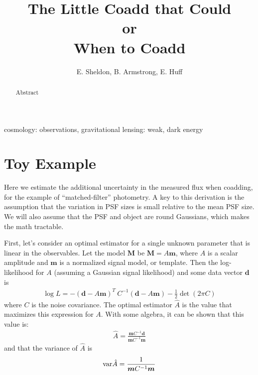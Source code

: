 \documentclass[a4paper,fleqn,usenatbib,referee]{mnras}
\title{The Little Coadd that Could\\
or\\
When to Coadd}
\author[E. Sheldon, B. Armstrong, E. Huff]{E. Sheldon, B. Armstrong, E. Huff}
\begin{document}
\maketitle

\begin{abstract}

    Abstract

\end{abstract}


\begin{keywords}                                                                    
    cosmology: observations,
    gravitational lensing: weak,
    dark energy
\end{keywords} 

\section{Toy Example} \label{sec:intro}

Here we estimate the additional uncertainty in the measured flux when coadding,
for the example of ``matched-filter'' photometry.  A key to this derivation is
the assumption that the variation in PSF sizes is small relative to the mean
PSF size.  We will also assume that the PSF and object are round Gaussians,
which makes the math tractable.

First, let's consider an optimal estimator for a single unknown parameter that
is linear in the observables. Let the model $\boldsymbol{M}$ be $\boldsymbol{M}
= A\boldsymbol{m}$, where $A$ is a scalar amplitude and $\boldsymbol{m}$ is a
normalized signal model, or template. Then the log-likelihood for $A$ (assuming
a Gaussian signal likelihood) and some data vector $\boldsymbol{d}$ is
\begin{align}
  \log L = - (\boldsymbol{d} - A\boldsymbol{m})^T\: C^{-1} (\boldsymbol{d} - A\boldsymbol{m}) - \frac{1}{2} \det(2\pi C )
\end{align}
where $C$ is the noise covariance. The optimal estimator $\hat{A}$ is the value
that maximizes this expression for $A$. With some algebra, it can be shown that
this value is:
\begin{align}
\hat{A} = \frac{\boldsymbol{m} C^{-1} \boldsymbol{d}}{\boldsymbol{m} C^{-1} \boldsymbol{m}}
\end{align}
and that the variance of $\hat{A}$ is
\begin{align}
{\rm var}\hat{A} = \frac{1}{{\boldsymbol{m} C^{-1} \boldsymbol{m}}}
\end{align}
\end{document}
